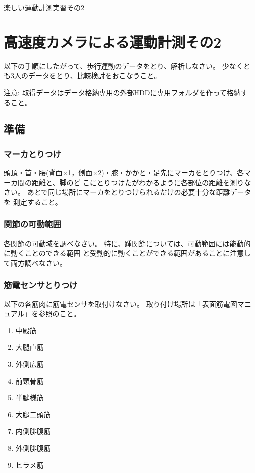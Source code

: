 \documentclass{jarticle}
\begin{document}
\begin{center}
  {\LARGE 楽しい運動計測実習その2}
\end{center}

\section{高速度カメラによる運動計測その2}

以下の手順にしたがって、歩行運動のデータをとり、解析しなさい。
少なくとも3人のデータをとり、比較検討をおこなうこと。

\begin{center}
  注意: 取得データはデータ格納専用の外部HDDに専用フォルダを作って格納す
  ること。
\end{center}

\subsection{準備}
\subsubsection{マーカとりつけ}
頭頂・首・腰(背面×1，側面×2)・膝・かかと・足先にマーカをとりつけ、各マーカ間の距離と、脚のど
こにとりつけたがわかるように各部位の距離を測りなさい。
あとで同じ場所にマーカをとりつけられるだけの必要十分な距離データを
測定すること。

\subsubsection{関節の可動範囲}
各関節の可動域を調べなさい。
特に、踵関節については、可動範囲には能動的に動くことのできる範囲
と受動的に動くことができる範囲があることに注意して両方調べなさい。

\subsubsection{筋電センサとりつけ}
以下の各筋肉に筋電センサを取付けなさい。
取り付け場所は「表面筋電図マニュアル」を参照のこと。
\begin{enumerate}
\item 中殿筋
\item 大腿直筋
\item 外側広筋
\item 前頸骨筋
\item 半腱様筋
\item 大腿二頭筋
\item 内側腓腹筋
\item 外側腓腹筋
\item ヒラメ筋
\end{enumerate}
\end{document}
